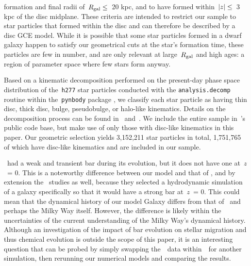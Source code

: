 formation and final radii of~$R_\text{gal} \leq$~20 kpc, and to have formed 
within~$\left|z\right|\leq$~3 kpc of the disc midplane. 
These criteria are intended to restrict our sample to star particles that 
formed within the disc and can therefore be described by a disc GCE model. 
While it is possible that some star particles formed in a dwarf galaxy happen 
to satisfy our geometrical cuts at the star's formation time, these particles 
are few in number, and are only relevant at large~$R_\text{gal}$ and high 
ages: a region of parameter space where few stars form anyway. 
\par 
Based on a kinematic decomposition performed on the present-day phase space 
distribution of the~\texttt{h277} star particles conducted with the 
\texttt{analysis.decomp} routine within the~\texttt{pynbody} package 
\citep{Pontzen2013}, we classify each star particle as having thin disc, thick 
disc, bulge, pseudobulge, or halo-like kinematics.
Details on the decomposition process can be found in~\citet{Brook2012} 
and~\citet{Bird2013}. 
We include the entire sample in~\vice's public code base, but make use of only 
those with disc-like kinematics in this paper. 
Our geometric selection yields 3,152,211 star particles in total, 1,751,765 of 
which have disc-like kinematics and are included in our sample. 
\par 
\hsim~had a weak and transient bar during its evolution, but it does not have 
one at~$z$~= 0. 
This is a noteworthy difference between our model and that of 
\citet{Minchev2013}, and by extension the~\citet{Minchev2014, Minchev2017} 
studies as well, because they selected a hydrodynamic simulation of a galaxy 
specifically so that it would have a strong bar at~$z$~= 0. 
This could mean that the dynamical history of our model Galaxy differs from 
that of~\citet{Minchev2013} and perhaps the Milky Way itself. 
However, the difference is likely within the uncertainties of the current 
understanding of the Milky Way's dynamical history. 
Although an investigation of the impact of bar evolution on stellar migration 
and thus chemical evolution is outside the scope of this paper, it is an 
interesting question that can be probed by simply swapping the~\hsim~data 
within~\vice~for another simulation, then rerunning our numerical models and 
comparing the results. 

